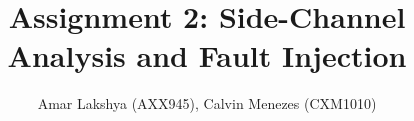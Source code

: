 \documentclass[1p,16pt]{elsarticle}
\begin{document}
\begin{frontmatter}



\title{Assignment 2: Side-Channel Analysis and Fault Injection}


\author{Amar Lakshya (AXX945), Calvin Menezes (CXM1010)}

\address{School of Computer Science, University of Birmingham}

%
%
%
%
\end{frontmatter}


\end{document}

